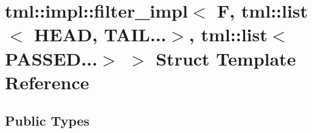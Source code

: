 \hypertarget{structtml_1_1impl_1_1filter__impl_3_01F_00_01tml_1_1list_3_01HEAD_00_01TAIL_8_8_8_4_00_01tml_1_1list_3_01PASSED_8_8_8_4_01_4}{\section{tml\+:\+:impl\+:\+:filter\+\_\+impl$<$ F, tml\+:\+:list$<$ H\+E\+A\+D, T\+A\+I\+L...$>$, tml\+:\+:list$<$ P\+A\+S\+S\+E\+D...$>$ $>$ Struct Template Reference}
\label{structtml_1_1impl_1_1filter__impl_3_01F_00_01tml_1_1list_3_01HEAD_00_01TAIL_8_8_8_4_00_01tml_1_1list_3_01PASSED_8_8_8_4_01_4}
}
\subsection*{Public Types}
